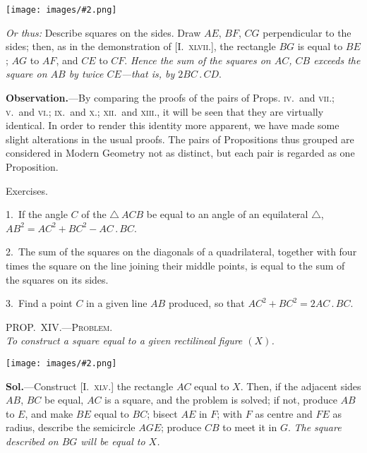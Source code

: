 \documentclass[oneside]{book}
\newcommand\myprop[2]{
\bigskip\Needspace*{4\baselineskip}\begin{center}\textsc{#1}\\\medskip\emph{#2}\par\end{center}
}
\newcommand\exhead[1]{
\Needspace*{5\baselineskip}\begin{center}
\textsf{#1}
\end{center}
}
\newcommand\imgcent[2]{
\begin{center}
\texttt{[image: images/\#2.png]}
\end{center}
}
\begin{document}
\imgcent{206}{f098}

\textit{Or thus:} Describe squares on the sides. Draw $AE$,
$BF$, $CG$ perpendicular to the sides; then, as in the
demonstration of [I.~\textsc{xlvii.}], the rectangle $BG$ is equal
to $BE$; $AG$ to $AF$, and $CE$ to $CF$. \textit{Hence the sum of
the squares on $AC$, $CB$ exceeds the square on $AB$ by twice
$CE$---that is, by $2BC\,.\,CD$}.\par\medskip

\begin{footnotesize}
\textbf{Observation.}---By comparing the proofs of the pairs of
Props. \textsc{iv.}\ and \textsc{vii.; v.}\ and \textsc{vi.; ix.}\ and \textsc{x.; xii.}\ and \textsc{xiii.}, it
will be seen that they are virtually identical. In order to render
this identity more apparent, we have made some slight alterations
in the usual proofs. The pairs of Propositions thus grouped are
considered in Modern Geometry not as distinct, but each pair is
regarded as one Proposition.
\par\end{footnotesize}

\exhead{Exercises.}

\begin{footnotesize}
1.~If the angle $C$ of the $\triangle~ACB$ be equal to an angle of an
equilateral $\triangle$, $AB^2 = AC^2 + BC^2 - AC\,.\,BC$.

2.~The sum of the squares on the diagonals of a quadrilateral,
together with four times the square on the line joining their
middle points, is equal to the sum of the squares on its sides.

3.~Find a point $C$ in a given line $AB$ produced, so that
$AC^2 + BC^2 = 2AC\,.\,BC$.
\par\end{footnotesize}

\myprop{PROP\@.~XIV\@.---Problem.}{To construct a square equal to a given rectilineal figure $(X)$.}

\imgcent{225}{f099}

\textbf{Sol.}---Construct [I.~\textsc{xlv.}] the rectangle $AC$ equal to
$X$. Then, if the adjacent sides $AB$, $BC$ be equal, $AC$
is a square, and the problem is solved; if not, produce
$AB$ to $E$, and make $BE$ equal to $BC$; bisect $AE$ in $F$;
with $F$ as centre and $FE$ as radius, describe the semicircle
$AGE$; produce $CB$ to meet it in $G$. \textit{The square
described on $BG$ will be equal to $X$.}
\end{document}
